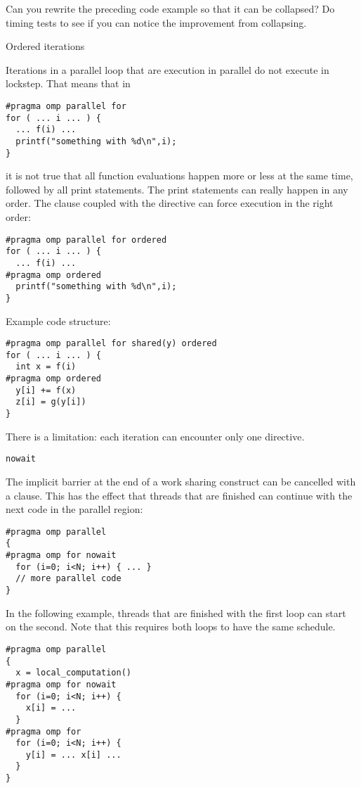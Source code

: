\begin{exercise}
  Can you rewrite the preceding code example so that it can be
  collapsed?
  Do timing tests to see if you can notice the improvement from collapsing.
\end{exercise}

 {Ordered iterations}

Iterations in a parallel loop that are execution in parallel do not
execute in lockstep. That means that in
\begin{verbatim}
#pragma omp parallel for
for ( ... i ... ) {
  ... f(i) ...
  printf("something with %d\n",i);
}
\end{verbatim}
it is not true that all function evaluations happen more or less at
the same time, followed by all print statements. The print statements
can really happen in any order. The  clause
coupled with the  directive can
force execution in the right order:
\begin{verbatim}
#pragma omp parallel for ordered
for ( ... i ... ) {
  ... f(i) ...
#pragma omp ordered
  printf("something with %d\n",i);
}
\end{verbatim}
Example code structure:
\begin{verbatim}
#pragma omp parallel for shared(y) ordered
for ( ... i ... ) {
  int x = f(i)
#pragma omp ordered
  y[i] += f(x)
  z[i] = g(y[i])
}
\end{verbatim}
There is a limitation:
each iteration can encounter only one  directive.

 {\texttt{nowait}}

The implicit barrier at the end of a work sharing construct
can be cancelled with a  clause.
This has the effect that threads that are finished can continue
with the next code in the parallel region:
\begin{verbatim}
#pragma omp parallel
{
#pragma omp for nowait
  for (i=0; i<N; i++) { ... }
  // more parallel code
}
\end{verbatim}

In the following example, threads that are finished with the first loop
can start on the second. Note that this requires both loops to have
the same schedule.
\begin{verbatim}
#pragma omp parallel
{
  x = local_computation()
#pragma omp for nowait
  for (i=0; i<N; i++) { 
    x[i] = ... 
  }
#pragma omp for 
  for (i=0; i<N; i++) { 
    y[i] = ... x[i] ...
  }
}
\end{verbatim}

